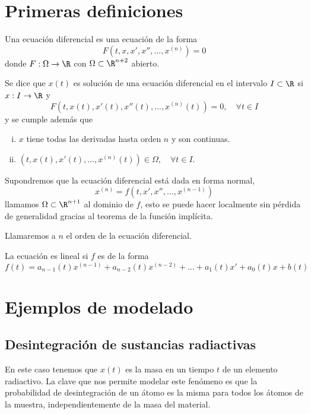 \documentclass[../main.tex]{subfiles}
\begin{document}
\section{Primeras definiciones}

\begin{definition}
	Una ecuación diferencial es una ecuación de la forma 
	\[F(t, x, x', x'', \dots, x^{(n)}) = 0\]
	donde \(F : \Omega \to \R\) con \(\Omega \subset \R^{n + 2}\) abierto.
\end{definition}

Se dice que \(x(t)\) es solución de una ecuación diferencial en el intervalo 
\(I \subset \R\) si \(x : I \to \R\) y
\[F(t, x(t), x'(t), x''(t), \dots, x^{(n)}(t)) = 0, \quad \forall t \in I\]
y se cumple además que
\begin{enumerate}[i)]
	\item \(x\) tiene todas las derivadas hasta orden \(n\) y son continuas.
	\item \((t, x(t), x'(t), \dots, x^{(n)}(t)) \in \Omega, \quad \forall t \in I\).
\end{enumerate}

Supondremos que la ecuación diferencial está dada en forma normal,
\[x^{(n)} = f(t, x', x'', \dots, x^{(n - 1)})\]
llamamos \(\Omega \subset \R^{n + 1}\) al dominio de \(f\), esto se puede hacer
localmente sin pérdida de generalidad gracias al teorema de la función
implícita.

\begin{definition}
	Llamaremos a \(n\) el orden de la ecuación diferencial.
\end{definition}

\begin{definition}
	La ecuación es lineal si \(f\) es de la forma
	\[f(t) = a_{n - 1}(t)x^{(n - 1)} + a_{n - 2}(t)x^{(n - 2)} + 
		\dots + a_1(t)x' + a_0(t)x + b(t)\]
\end{definition}

\section{Ejemplos de modelado}

\subsection{Desintegración de sustancias radiactivas}

En este caso tenemos que \(x(t)\) es
la masa en un tiempo \(t\) de un elemento radiactivo. La clave que nos permite
modelar este fenómeno es que la probabilidad de desintegración de un átomo es la
misma para todos los átomos de la muestra, independientemente de la masa del
material.
\end{document}
